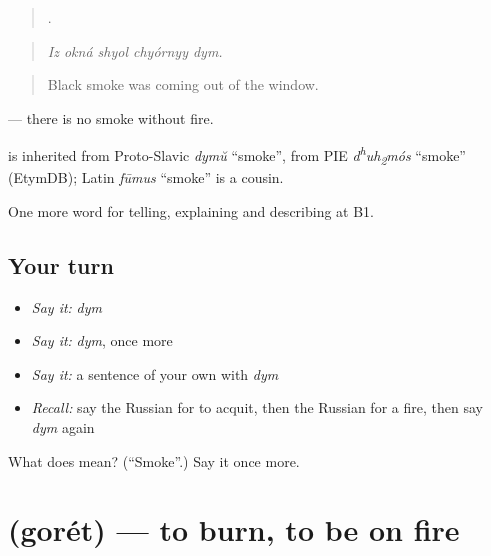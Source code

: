 \begin{quote}
    .
\end{quote}

\begin{quote}
\emph{Iz okná shyol chyórnyy dym.}
\end{quote}

\begin{quote}
Black smoke was coming out of the window.
\end{quote}

\emph{   } — there is no smoke without fire.

\begin{cousinweb}
\emph{} is inherited from Proto-Slavic \emph{dymŭ} \textquotedblleft{}smoke\textquotedblright{}, from PIE \emph{d\textsuperscript{h}uh\textsubscript{2}mós} \textquotedblleft{}smoke\textquotedblright{} (EtymDB); Latin \emph{fūmus} \textquotedblleft{}smoke\textquotedblright{} is a cousin.
\end{cousinweb}

\begin{grammarlens}[title={What you've built}]
One more word for telling, explaining and describing at B1.
\end{grammarlens}

\subsection*{Your turn}
\begin{itemize}
\raggedright
  \item \emph{Say it:} \emph{dym}
  \item \emph{Say it:} \emph{dym}, once more
  \item \emph{Say it:} a sentence of your own with \emph{dym}
  \item \emph{Recall:} say the Russian for to acquit, then the Russian for a fire, then say \emph{dym} again
\end{itemize}

\begin{tcolorbox}[breakable,colback=teal!4,colframe=teal!35!black,title={Before you move on}]
What does  mean? (\textquotedblleft{}Smoke\textquotedblright{}.) Say it once more.
\end{tcolorbox}
\section[\texorpdfstring{\ru{гореть} (gorét)}{гореть (gorét)}]{ (gorét) — to burn, to be on fire}

